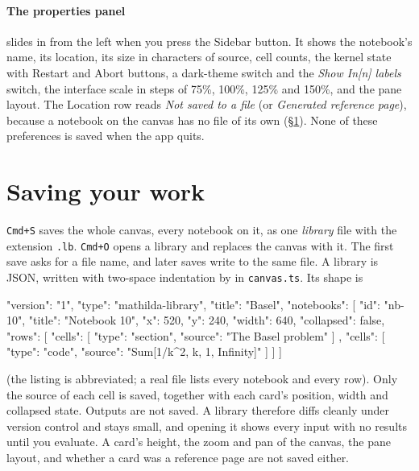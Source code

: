 \paragraph{The properties panel} slides in from the left when you press the
Sidebar button. It shows the notebook's name, its location, its size in
characters of source, cell counts, the kernel state with Restart and Abort
buttons, a dark-theme switch and the \emph{Show In[n] labels} switch, the interface
scale in steps of 75\%, 100\%, 125\% and 150\%, and the pane layout. The
Location row reads \emph{Not saved to a file} (or \emph{Generated reference
page}), because a notebook on the canvas has no file of its own
(\S\ref{sec:nb-files}). None of these
preferences is saved when the app quits.%

\section{Saving your work}
\label{sec:nb-files}

\texttt{Cmd+S} saves the whole canvas, every notebook on it, as one
\emph{library} file with the extension \texttt{.lb}. \texttt{Cmd+O} opens a
library and replaces the canvas with it. The first save asks for a file name,
and later saves write to the same file. A library is JSON, written with
two-space indentation by  in \texttt{canvas.ts}. Its
shape is

\begin{shell}
{
  "version": "1",
  "type": "mathilda-library",
  "title": "Basel",
  "notebooks": [
    {
      "id": "nb-10",
      "title": "Notebook 10",
      "x": 520, "y": 240, "width": 640, "collapsed": false,
      "rows": [
        { "cells": [ { "type": "section", "source": "The Basel problem" } ] },
        { "cells": [ { "type": "code", "source": "Sum[1/k^2, {k, 1, Infinity}]" } ] }
      ]
    }
  ]
}
\end{shell}

\noindent (the listing is abbreviated; a real file lists every notebook and
every row). Only the source of each cell is saved, together with each card's
position, width and collapsed state. Outputs are not saved. A library
therefore diffs cleanly under version control and stays small, and opening
it shows every input with no results until you evaluate. A card's height,
the zoom and pan of the canvas, the pane layout, and whether a card was a
reference page are not saved either.

